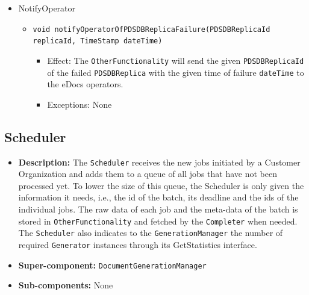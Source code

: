 \documentclass[a4paper,10pt]{article}
\begin{document}
\begin{itemize}
    \item NotifyOperator
    \begin{itemize}
        \item \texttt{void notifyOperatorOfPDSDBReplicaFailure(PDSDBReplicaId replicaId, TimeStamp dateTime)}
        \begin{itemize}
            \item Effect: The \texttt{OtherFunctionality} will send the given \texttt{PDSDBReplicaId} of the failed \texttt{PDSDBReplica} with the given time of failure \texttt{dateTime} to the eDocs operators.
            \item Exceptions: None
        \end{itemize}
    \end{itemize}

\end{itemize}

\subsection{Scheduler}
\begin{itemize}
    \item \textbf{Description:} The \texttt{Scheduler} receives the new jobs initiated by a Customer Organization and adds them to a queue of all jobs that have not been processed yet. To lower the size of this queue, the Scheduler is only given the information it needs, i.e., the id of the batch, its deadline and the ids of the individual jobs. The raw data of each job and the meta-data of the batch is stored in \texttt{OtherFunctionality} and fetched by the \texttt{Completer} when needed.\\
    The \texttt{Scheduler} also indicates to the \texttt{GenerationManager} the number of required \texttt{Generator} instances through its GetStatistics interface.
    \item \textbf{Super-component:} \texttt{DocumentGenerationManager}
    \item \textbf{Sub-components:} None
\end{itemize}
\end{document}

